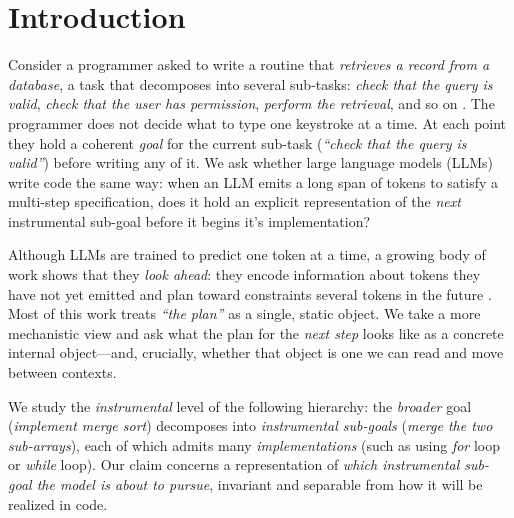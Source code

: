 \section{Introduction}
\label{sec:intro}


Consider a programmer asked to write a routine that \emph{retrieves a record from a database}, a task that decomposes into several sub-tasks: \emph{check that the query is valid}, \emph{check that the user has permission}, \emph{perform the retrieval}, and so on . The programmer does not decide what to type one keystroke at a time. At each point they hold a coherent \emph{goal} for the current sub-task (\textit{``check that the query is valid''}) before writing any of it. We ask whether large language models (LLMs) write code the same way: when an LLM emits a long span of tokens to satisfy a multi-step specification, does it hold an explicit representation of the \emph{next} instrumental sub-goal before it begins it's implementation?

Although LLMs are trained to predict one token at a time, a growing body of work shows that they \emph{look ahead}: they encode information about tokens they have not yet emitted \citep{pal2023futurelens} and plan toward constraints several tokens in the future \citep{lindsey2025biology}. Most of this work treats \emph{``the plan''} as a single, static object. We take a more mechanistic view and ask what the plan for the \emph{next step} looks like as a concrete internal object---and, crucially, whether that object is one we can read and move between contexts. 

We study the \emph{instrumental} level of the following hierarchy: the \emph{broader} goal (\emph{implement merge sort}) decomposes into \emph{instrumental sub-goals} (\textit{merge the two sub-arrays}), each of which admits many \emph{implementations} (such as using \emph{for} loop or \emph{while} loop). Our claim concerns a representation of \emph{which instrumental sub-goal the model is about to pursue}, invariant and separable from how it will be realized in code.

